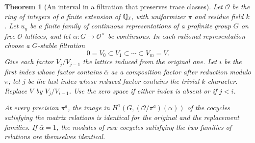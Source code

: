 \documentclass[a4paper,11pt]{article}
\newtheorem{theorem}[proposition]{Theorem}
\theoremstyle{definition}
\theoremstyle{remark}
\numberwithin{equation}{section}
\begin{document}
\begin{theorem}[An interval in a filtration that preserves trace classes]
\leavevmode\label{thm:residualinterval755}
Let \(\mathcal O\) be the ring of integers of a finite extension
of \(\mathbb Q_\ell\), with uniformizer \(\pi\) and residue field \(k\).
Let \(u_y\) be a finite family of continuous representations of
a profinite group \(G\) on free \(\mathcal O\)-lattices, and let
\(\alpha:G\to\mathcal O^\times\) be continuous. In each rational
representation choose a \(G\)-stable filtration
\[
                  0=V_0\subset V_1\subset\cdots\subset V_m=V .
\]
Give each factor \(V_j/V_{j-1}\) the lattice induced from the
original one. Let \(i\) be the first index whose factor contains
\(\bar\alpha\) as a composition factor after reduction modulo
\(\pi\); let \(j\) be the last index whose reduced factor
contains the trivial \(k\)-character. Replace \(V\) by
\(V_j/V_{i-1}\). Use the zero space if either index is absent
or if \(j<i\).

At every precision \(\pi^a\), the image in
\(H^1(G,(\mathcal O/\pi^a)(\alpha))\) of the cocycles satisfying
the matrix relations is identical for the original and the
replacement families. If \(\bar\alpha=1\), the modules of
raw cocycles satisfying the two families of relations are
themselves identical.
\end{theorem}
\end{document}
